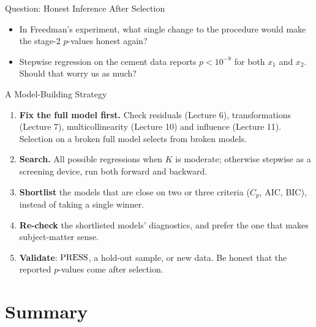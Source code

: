 \begin{frame}{Question: Honest Inference After Selection}
    \begin{itemize}
        \item In Freedman's experiment, what single change to the procedure would make the stage-2 $p$-values honest again?
        \item Stepwise regression on the cement data reports $p<10^{-8}$ for both $x_1$ and $x_2$. Should that worry us as much?
    \end{itemize}
\end{frame}


\begin{frame}{A Model-Building Strategy}
    \begin{enumerate}
        \item \textbf{Fix the full model first.} Check residuals (Lecture 6), transformations (Lecture 7), multicollinearity (Lecture 10) and influence (Lecture 11). Selection on a broken full model selects from broken models.
        \item \textbf{Search.} All possible regressions when $K$ is moderate; otherwise stepwise as a screening device, run both forward and backward.
        \item \textbf{Shortlist} the models that are close on two or three criteria ($C_p$, AIC, BIC), instead of taking a single winner.
        \item \textbf{Re-check} the shortlisted models' diagnostics, and prefer the one that makes subject-matter sense.
        \item \textbf{Validate}: $\mathrm{PRESS}$, a hold-out sample, or new data. Be honest that the reported $p$-values come after selection.
    \end{enumerate}
\end{frame}


\section{Summary}


